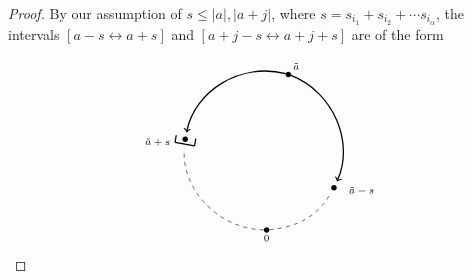 \documentclass{amsproc}
\theoremstyle{definition}
\theoremstyle{remark}
\numberwithin{equation}{section}
\newcommand{\nodeDist}{2}
\newcommand{\interval}{\longleftrightarrow}
\begin{document}
\begin{proof}
By our assumption of $s\leqslant |a|, |a+j|$, where $s=s_{i_1}+s_{i_2}+\cdots s_{i_\alpha}$, the intervals $[a-s\interval a+s]$ and $[a+j-s\interval a+j+s]$ are of the form

\newcommand{\bracksize}{0.1}
\[\begin{tikzpicture}[baseline,vertex/.style={anchor=base, circle, fill,minimum size=4pt, inner sep=0pt, outer sep=0pt},auto,
                               edge/.style={->,>=latex, shorten > = 5pt,shorten < = 5pt},
position/.style args={#1:#2 from #3}{
    at=(#3.#1), anchor=#1+180, shift=(#1-90:#2)
}]

  \coordinate (vc) {};
  \node[vertex,position = 0:{\nodeDist} from vc] (v0) {};
  \node[vertex,position = -100:{\nodeDist} from vc] (v1L) {};
  \node[vertex,position = 60:{\nodeDist} from vc] (v1R) {};
  \node[vertex,position = 160:{\nodeDist} from vc] (v2R) {};

  \node[coordinate,position=-40:{1*\bracksize} from v1L] (LbrackC) {};
  \node[coordinate,position=-100:{2.5*\bracksize} from LbrackC] (LbrackL1) {};
  \node[coordinate,position=80:{2.5*\bracksize} from LbrackC] (LbrackR1) {};
  \node[coordinate,position=170:{1.8*\bracksize} from LbrackL1] (LbrackL2) {};
  \node[coordinate,position=170:{1.8*\bracksize} from LbrackR1] (LbrackR2) {};

  \node[coordinate,position=-60:{1*\bracksize} from v1R] (RbrackC) {};
  \node[coordinate,position=-120:{2.5*\bracksize} from RbrackC] (RbrackL1) {};
  \node[coordinate,position=60:{2.5*\bracksize} from RbrackC] (RbrackR1) {};
  \node[coordinate,position=150:{1.8*\bracksize} from RbrackL1] (RbrackL2) {};
  \node[coordinate,position=150:{1.8*\bracksize} from RbrackR1] (RbrackR2) {};

  \draw (v0) node[below] {\scriptsize ${0}$};
  \draw (LbrackL1) node[left] {\scriptsize ${\tilde a+s}$};
  \draw (RbrackR2) node[right] {\scriptsize ${\tilde a-s}$};
  \draw (v2R) node[above right] {\scriptsize ${\tilde a}$};

  \draw [dashed, shorten < = 5] (v1R) to[bend left = 27] (v0);
  \draw [dashed, shorten > = 5] (v0) to[bend left = 47] (v1L);
  \draw [<-, shorten < = 3, line width = 0.9] (v1L) to[bend left = 47] (v2R);
  \draw [->, shorten > = 3, line width = 0.9] (v2R) to[bend left = 47] (v1R);

  \draw [line width = 0.9] (LbrackL2) to (LbrackL1);
  \draw [line width = 0.9] (LbrackL1) to (LbrackR1);
  \draw [line width = 0.9] (LbrackR1) to (LbrackR2);


\end{tikzpicture}\]
\end{proof}
\end{document}
